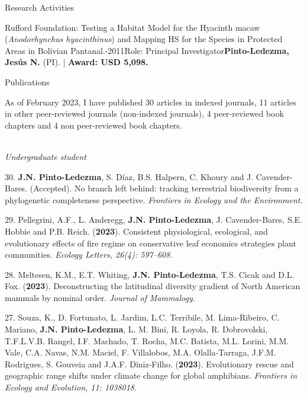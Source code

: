 \documentclass{resume} %
\begin{document}
\begin{rSection}{Research Activities}
\begin{pSubsection}{Rufford Foundation: }{\normalfont Testing a Habitat Model for the Hyacinth macaw (\emph{Anodorhynchus hyacinthinus}) and Mapping HS for the Species in Protected Areas in Bolivian Pantanal.}{-2011}{\normalfont Role: Principal Investigator}{\textbf{Pinto-Ledezma, Jesús N.} \normalfont (PI). | {\bf Award: USD 5,098.}}
\end{pSubsection}

\end{rSection}


\begin{rSection}{Publications}

\normalfont As of February 2023, I have published 30 articles in indexed journals, 11 articles in other peer-reviewed journals (non-indexed journals), 4 peer-reviewed book chapters and 4 non peer-reviewed book chapters.

 \\
{\em *Undergraduate student}

{30.} {\bf{J.N. Pinto-Ledezma}}, {S. Díaz, B.S. Halpern, C. Khoury and J. Cavender-Bares. (Accepted). No branch left behind: tracking terrestrial biodiversity from a phylogenetic completeness perspective.} {\em Frontiers in Ecology and the Environment.} 

{29.} {Pellegrini, A.F., L. Anderegg, } {\bf{J.N. Pinto-Ledezma}}, {J. Cavender-Bares, S.E. Hobbie and P.B. Reich. ({\bf{2023}}). Consistent physiological, ecological, and evolutionary effects of fire regime on conservative leaf economics strategies plant communities.} {\em Ecology Letters, 26(4): 597–608.}

{28.} {Meltesen, K.M., E.T. Whiting,} {\bf{J.N. Pinto-Ledezma}}, {T.S. Cicak and D.L. Fox. ({\bf{2023}}). Deconstructing the latitudinal diversity gradient of North American mammals by nominal order.} {\em Journal of Mammalogy.}

{27.} {Souza, K., D. Fortunato, L. Jardim, L.C. Terribile, M. Lima-Ribeiro, C. Mariano,} {\bf{J.N. Pinto-Ledezma}}, {L. M. Bini, R. Loyola, R. Dobrovolski, T.F.L.V.B. Rangel, I.F. Machado, T. Rocha, M.C. Batista, M.L. Lorini, M.M. Vale, C.A. Navas, N.M. Maciel, F. Villalobos, M.A. Olalla-Tarraga, J.F.M. Rodrigues, S. Gouveia and J.A.F. Diniz-Filho. ({\bf{2023}}). Evolutionary rescue and geographic range shifts under climate change for global amphibians.} {\em Frontiers in Ecology and Evolution, 11: 1038018.}


\end{rSection}
\end{document}
